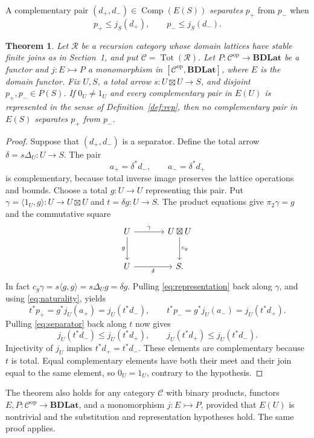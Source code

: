 \documentclass[11pt]{article}
\newtheorem{theorem}{Theorem}[section]
\theoremstyle{definition}
\newcommand{\R}{\mathcal R}
\newcommand{\C}{\mathcal C}
\newcommand{\BDLat}{\mathbf{BDLat}}
\newcommand{\Tot}{\operatorname{Tot}}
\newcommand{\Comp}{\operatorname{Comp}}
\begin{document}
A complementary pair $(d_+,d_-)\in\Comp(E(S))$ \emph{separates}
$p_+$ from $p_-$ when
\begin{equation}\label{eq:separator}
 p_+\leq j_S(d_+),\qquad p_-\leq j_S(d_-).
\end{equation}
\begin{theorem}\label{thm:inseparability}
Let $\R$ be a recursion category whose domain lattices have stable
finite joins as in Section~1, and put $\C=\Tot(\R)$.
Let $P:\C^{\mathrm{op}}\to\BDLat$ be a functor and
$j:E\rightarrowtail P$ a monomorphism in
$[\C^{\mathrm{op}},\BDLat]$, where $E$ is the domain functor.
Fix $U,S$, a total arrow
$s:U\boxtimes U\to S$, and disjoint $p_+,p_-\in P(S)$.
If $0_U\ne1_U$ and every complementary pair in $E(U)$ is represented
in the sense of Definition~\ref{def:rep}, then no complementary pair
in $E(S)$ separates $p_+$ from $p_-$.
\end{theorem}

\begin{proof}
Suppose that $(d_+,d_-)$ is a separator. Define the total arrow
$\delta=s\Delta_U:U\to S$. The pair
\[
 a_+=\delta^*d_-,\qquad a_-=\delta^*d_+
\]
is complementary, because total inverse image preserves the lattice
operations and bounds. Choose a total $g:U\to U$ representing this pair.
Put $\gamma=\langle1_U,g\rangle:U\to U\boxtimes U$ and
$t=\delta g:U\to S$. The product equations give $\pi_2\gamma=g$
and the commutative square
\[
\begin{tikzcd}[column sep=large,row sep=large]
 U \arrow[r,"\gamma"] \arrow[d,"g"']
   & U\boxtimes U \arrow[d,"c_g"] \\
 U \arrow[r,"\delta"'] & S.
\end{tikzcd}
\]
In fact $c_g\gamma=s\langle g,g\rangle=s\Delta_Ug=\delta g$.
Pulling \eqref{eq:representation} back along $\gamma$, and using
\eqref{eq:naturality}, yields
\[
 t^*p_+=g^*j_U(a_+)=j_U(t^*d_-),\qquad
 t^*p_-=g^*j_U(a_-)=j_U(t^*d_+).
\]
Pulling \eqref{eq:separator} back along $t$ now gives
\[
 j_U(t^*d_-)\leq j_U(t^*d_+),\qquad
 j_U(t^*d_+)\leq j_U(t^*d_-).
\]
Injectivity of $j_U$ implies $t^*d_+=t^*d_-$. These elements are
complementary because $t$ is total. Equal complementary elements have
both their meet and their join equal to the same element, so
$0_U=1_U$, contrary to the hypothesis.
\end{proof}

The theorem also holds for any category $\C$ with binary products,
functors $E,P:\C^{\mathrm{op}}\to\BDLat$, and a monomorphism
$j:E\rightarrowtail P$, provided that $E(U)$ is nontrivial and the
substitution and representation hypotheses hold. The same proof applies.
\end{document}
